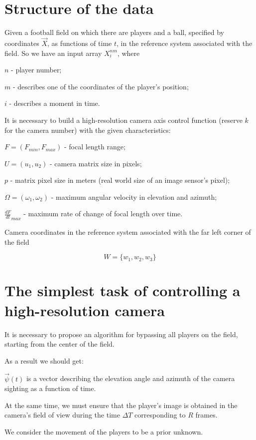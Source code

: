 \section{Structure of the data}

Given a football field on which there are players and a ball, specified by coordinates $\vec X$, as functions of time $t$, in the reference system associated with the field. So we have an input array $X^{nm}_i$, where

$n$ - player number;

$m$ - describes one of the coordinates of the player’s position;

$i$ - describes a moment in time.

It is necessary to build a high-resolution camera axis control function (reserve $k$ for the camera number) with the given characteristics:

$F=(F_{min},F_{max})$ - focal length range;

$U=(u_1,u_2)$ - camera matrix size in pixels;

$p$ - matrix pixel size in meters (real world size of an image sensor's pixel);

$\Omega=(\omega_1, \omega_2)$ - maximum angular velocity in elevation and azimuth;

$\frac{dF}{dt}_{max}$ - maximum rate of change of focal length over time.

Camera coordinates in the reference system associated with the far left corner of the field

$$W=\{w_1,w_2,w_3\}$$




\section{The simplest task of controlling a high-resolution camera}

It is necessary to propose an algorithm for bypassing all players on the field, starting from the center of the field.

As a result we should get:

$\vec \psi(t)$ is a vector describing the elevation angle and azimuth of the camera sighting as a function of time.

At the same time, we must ensure that the player’s image is obtained in the camera’s field of view during the time $\Delta T$ corresponding to $R$ frames.

We consider the movement of the players to be a prior unknown.

